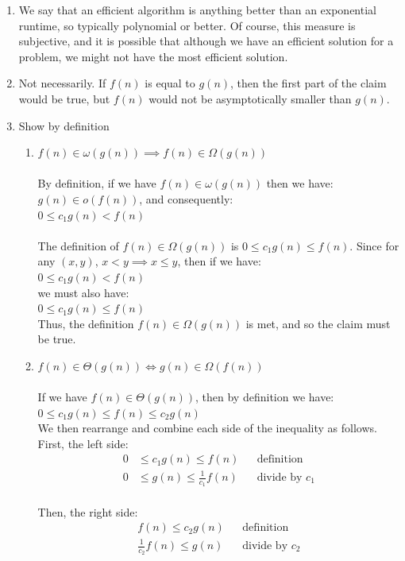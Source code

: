 \documentclass{article}
\begin{document}
\begin{enumerate}
	\item We say that an efficient algorithm is anything better than an exponential runtime, so typically polynomial or better. Of course, this measure is subjective, and it is possible that although we have an efficient solution for a problem, we might not have the most efficient solution.
	\item Not necessarily. If $f(n)$ is equal to $g(n)$, then the first part of the claim would be true, but $f(n)$ would not be asymptotically smaller than $g(n)$.
	\item Show by definition 
		\begin{enumerate}
			\item $f(n)\in \omega (g(n)) \implies f(n) \in \Omega (g(n))$
			\\ \\ By definition, if we have $f(n)\in \omega (g(n))$ then we have:
			\\ $g(n) \in o(f(n))$, and consequently:
			\\ $0\leq c_1g(n) < f(n)$
			\\ \\ The definition of $f(n) \in \Omega (g(n))$ is $0\leq c_1g(n) \leq f(n)$. Since for any $(x,y)$, $x<y \implies x\leq y$, then if we have:
			\\ $0\leq c_1g(n) < f(n)$
			\\ we must also have:
			\\ $0\leq c_1g(n) \leq f(n)$
			\\ Thus, the definition $f(n) \in \Omega (g(n))$ is met, and so the claim must be true.
			\item $f(n) \in \Theta (g(n)) \iff g(n)\in \Omega (f(n))$
			\\\\ If we have $f(n) \in \Theta (g(n))$, then by definition we have:
			\\ $0 \leq c_1g(n) \leq f(n) \leq c_2g(n)$
			\\ We then rearrange and combine each side of the inequality as follows. First, the left side:
			\begin{align}
				0 &\leq c_1g(n) \leq f(n) && \text{definition} \\
				0 &\leq g(n) \leq \frac{1}{c_1}f(n) && \text{divide by $c_1$}
			\end{align}
			\\ Then, the right side:
			\begin{align}
				f(n) \leq c_2g(n) && \text{definition} \\
				\frac{1}{c_2}f(n) \leq g(n) && \text{divide by $c_2$}

\end{align}
\end{enumerate}
\end{enumerate}
\end{document}
